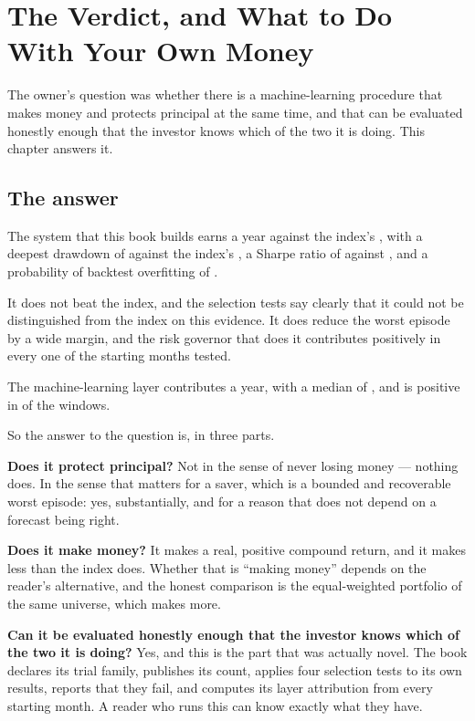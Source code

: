 
\chapter{The Verdict, and What to Do With Your Own Money}
\label{ch:verdict}

The owner's question was whether there is a machine-learning procedure that
makes money and protects principal at the same time, and that can be
evaluated honestly enough that the investor knows which of the two it is
doing. This chapter answers it.

\section{The answer}

The system that this book builds earns \numFullCAGR{} a year against the
index's \numSpyCAGR{}, with a deepest drawdown of \numFullDD{} against
the index's \numSpyDD{}, a Sharpe ratio of \numFullSharpe{} against
\numSpySharpe{}, and a probability of backtest overfitting of \numPBO{}.

It does not beat the index, and the selection tests say clearly that it
could not be distinguished from the index on this evidence. It does
reduce the worst episode by a wide margin, and the risk governor that does
it contributes positively in every one of the \numWindowCount{} starting
months tested.

The machine-learning layer contributes \numTiltMean{} a year, with a
median of \numTiltMedian{}, and is positive in \numTiltPosFrac{} of the
windows.

So the answer to the question is, in three parts.

\textbf{Does it protect principal?} Not in the sense of never losing
money --- nothing does. In the sense that matters for a saver, which is a
bounded and recoverable worst episode: yes, substantially, and for a
reason that does not depend on a forecast being right.

\textbf{Does it make money?} It makes a real, positive compound return,
and it makes less than the index does. Whether that is ``making money''
depends on the reader's alternative, and the honest comparison is the
equal-weighted portfolio of the same universe, which makes more.

\textbf{Can it be evaluated honestly enough that the investor knows which
of the two it is doing?} Yes, and this is the part that was actually
novel. The book declares its trial family, publishes its count, applies
four selection tests to its own results, reports that they fail, and
computes its layer attribution from every starting month. A reader who
runs this can know exactly what they have.

